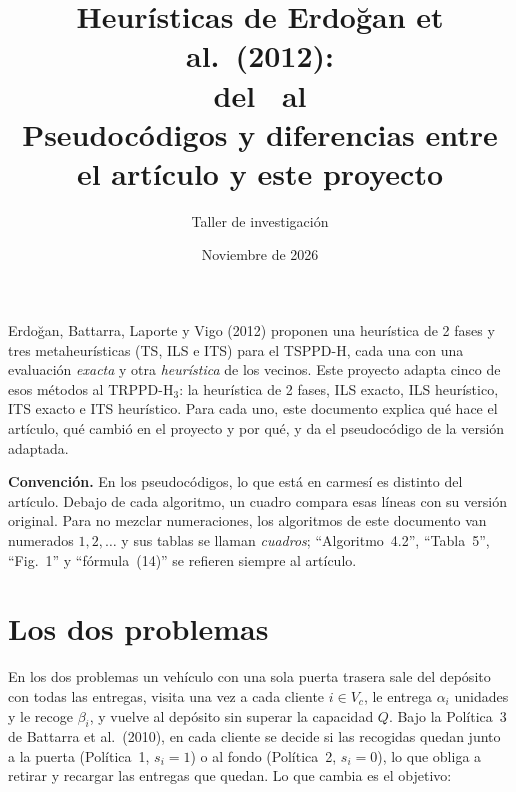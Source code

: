 \documentclass{article}
\title{Heurísticas de Erdoğan et al.\ (2012):\\ del \TSPPDH\ al \TRPPDH\\[4pt]
\large Pseudocódigos y diferencias entre el artículo y este proyecto}
\author{Taller de investigación}
\date{Noviembre de 2026}
\newcommand{\cambio}[1]{\textcolor{carmesi}{#1}}
\newcommand{\TSPPDH}{TSPPD-H}
\newcommand{\TRPPDH}{TRPPD-H$_3$}
\begin{document}
\maketitle

\noindent Erdoğan, Battarra, Laporte y Vigo (2012) proponen una heurística de 2 fases y tres metaheurísticas (TS, ILS e ITS) para el \TSPPDH, cada una con una evaluación \emph{exacta} y otra \emph{heurística} de los vecinos. Este proyecto adapta cinco de esos métodos al \TRPPDH: la heurística de 2 fases, ILS exacto, ILS heurístico, ITS exacto e ITS heurístico. Para cada uno, este documento explica qué hace el artículo, qué cambió en el proyecto y por qué, y da el pseudocódigo de la versión adaptada.

\medskip
\noindent\textbf{Convención.} En los pseudocódigos, lo que está en \cambio{carmesí} es distinto del artículo. Debajo de cada algoritmo, un cuadro compara esas líneas con su versión original. Para no mezclar numeraciones, los algoritmos de este documento van numerados $1, 2, \dots$ y sus tablas se llaman \emph{cuadros}; ``Algoritmo~4.2'', ``Tabla~5'', ``Fig.~1'' y ``fórmula~(14)'' se refieren siempre al artículo.

\tableofcontents

\section{Los dos problemas}

En los dos problemas un vehículo con una sola puerta trasera sale del depósito con todas las entregas, visita una vez a cada cliente $i \in V_c$, le entrega $\alpha_i$ unidades y le recoge $\beta_i$, y vuelve al depósito sin superar la capacidad $Q$. Bajo la Política~3 de Battarra et al.\ (2010), en cada cliente se decide si las recogidas quedan junto a la puerta (Política~1, $s_i = 1$) o al fondo (Política~2, $s_i = 0$), lo que obliga a retirar y recargar las entregas que quedan. Lo que cambia es el objetivo:
\end{document}
